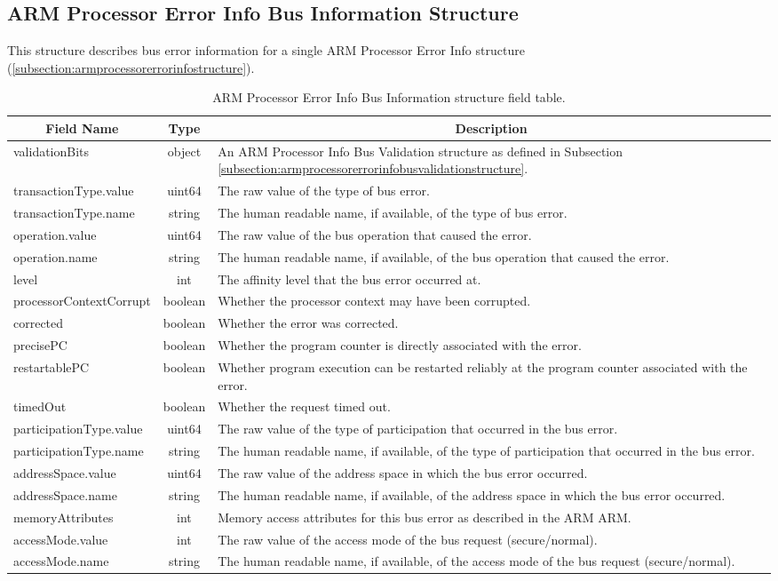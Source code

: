 \documentclass{report}
\newcommand*{\thead}[1]{\multicolumn{1}{|c|}{\bfseries #1}}
\newcommand*{\jsontable}[1]{
    \begin{table}[!ht]
    \label{#1}
    \centering
    \begin{adjustbox}{center}
    \begin{tabular}{|l|c|p{8cm}|}
    \hline
    \thead{Field Name} & \thead{Type} & \thead{Description} \\
    \hline
}
\newcommand*{\jsontableend}[1]{
    \hline
    \end{tabular}
    \end{adjustbox}
    \caption{#1}
    \label{table:#1}
    \end{table}
    \FloatBarrier
}
\begin{document}
\subsection{ARM Processor Error Info Bus Information Structure}
\label{subsection:armprocessorerrorinfoerrorinformationbusstructure}
This structure describes bus error information for a single ARM Processor Error Info structure (\ref{subsection:armprocessorerrorinfostructure}).
\jsontable{table:armprocessorerrorinfoerrorinformationbusstructure}
validationBits & object & An ARM Processor Info Bus Validation structure as defined in Subsection \ref{subsection:armprocessorerrorinfobusvalidationstructure}.\\
\hline
transactionType.value & uint64 & The raw value of the type of bus error.\\
transactionType.name & string & The human readable name, if available, of the type of bus error.\\
\hline
operation.value & uint64 & The raw value of the bus operation that caused the error.\\
operation.name & string & The human readable name, if available, of the bus operation that caused the error.\\
\hline
level & int & The affinity level that the bus error occurred at.\\
\hline
processorContextCorrupt & boolean & Whether the processor context may have been corrupted.\\
\hline
corrected & boolean & Whether the error was corrected.\\
\hline
precisePC & boolean & Whether the program counter is directly associated with the error.\\
\hline
restartablePC & boolean & Whether program execution can be restarted reliably at the program counter associated with the error.\\
\hline
timedOut & boolean & Whether the request timed out.\\
\hline
participationType.value & uint64 & The raw value of the type of participation that occurred in the bus error.\\
participationType.name & string & The human readable name, if available, of the type of participation that occurred in the bus error.\\
\hline
addressSpace.value & uint64 & The raw value of the address space in which the bus error occurred.\\
addressSpace.name & string & The human readable name, if available, of the address space in which the bus error occurred.\\
\hline
memoryAttributes & int & Memory access attributes for this bus error as described in the ARM ARM.\\
\hline
accessMode.value & int & The raw value of the access mode of the bus request (secure/normal).\\
accessMode.name & string & The human readable name, if available, of the access mode of the bus request (secure/normal).\\
\jsontableend{ARM Processor Error Info Bus Information structure field table.}
\end{document}

